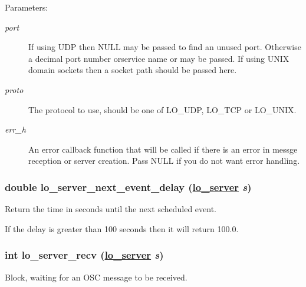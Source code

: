 \begin{Desc}
\item[Parameters:]
\begin{description}
\item[{\em port}]If using UDP then NULL may be passed to find an unused port. Otherwise a decimal port number orservice name or may be passed. If using UNIX domain sockets then a socket path should be passed here. \item[{\em proto}]The protocol to use, should be one of LO\_\-UDP, LO\_\-TCP or LO\_\-UNIX. \item[{\em err\_\-h}]An error callback function that will be called if there is an error in messge reception or server creation. Pass NULL if you do not want error handling. \end{description}
\end{Desc}
\hypertarget{group__liblolowlevel_g750076fdd75e2a7d3e442f6bd5968fb9}{
\subsubsection[lo\_\-server\_\-next\_\-event\_\-delay]{\setlength{\rightskip}{0pt plus 5cm}double lo\_\-server\_\-next\_\-event\_\-delay (\hyperlink{lo__types_8h_59067bf50cf8abb4371da6f03c9036c9}{lo\_\-server} {\em s})}}
\label{group__liblolowlevel_g750076fdd75e2a7d3e442f6bd5968fb9}


Return the time in seconds until the next scheduled event. 

If the delay is greater than 100 seconds then it will return 100.0. \hypertarget{group__liblolowlevel_gebef3611d24e4b5f60f16cce76a9e271}{
\subsubsection[lo\_\-server\_\-recv]{\setlength{\rightskip}{0pt plus 5cm}int lo\_\-server\_\-recv (\hyperlink{lo__types_8h_59067bf50cf8abb4371da6f03c9036c9}{lo\_\-server} {\em s})}}
\label{group__liblolowlevel_gebef3611d24e4b5f60f16cce76a9e271}


Block, waiting for an OSC message to be received. 


